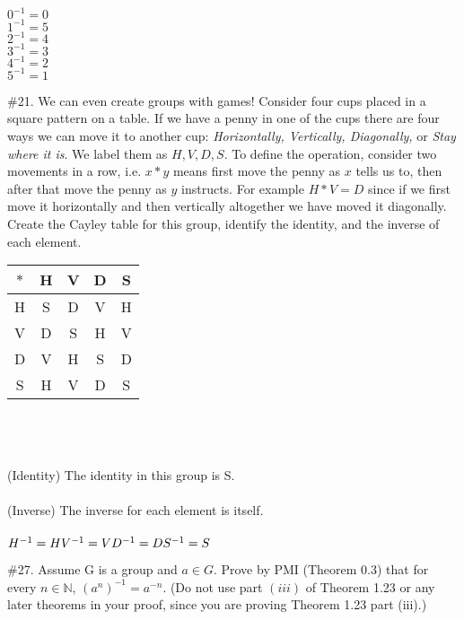 \documentclass[11pt]{amsart}
\begin{document}
\\
\\
\\$0^{-1}=0$\\$1^{-1}=5$\\$2^{-1}=4$\\$3^{-1}=3$\\$4^{-1}=2$\\$5^{-1}=1$ 

\vskip 0.5in



\#21. We can even create groups with games! Consider four cups placed in a square pattern on a table. If we have a penny in one of the cups there are four ways we can move it to another cup: \emph{Horizontally, Vertically, Diagonally,} or \emph{Stay where it is}. We label them as $H, V, D, S$. To define the operation, consider two movements in a row, i.e. $x \ast y$ means first move the penny as $x$ tells us to, then after that move the penny as $y$ instructs. For example $H \ast V = D$ since if we first move it horizontally and then vertically altogether we have moved it diagonally. Create the Cayley table for this group, identify the identity, and the inverse of each element.\\
\vskip 0.1in
\begin{tabular}{c | c  c  c  c }
	$\ast$ & H & V & D & S\\
	\hline
	H & S & D & V & H \\
	
	V & D & S & H & V \\
	
	D & V & H & S & D \\
	
	S & H & V & D & S\\
\end{tabular}
\\
\\
\\(Identity) The identity in this group is S.
\\
\\(Inverse) The inverse for each element is itself.\\ \\$H^{-1}=H\\V^{-1}=V\\D^{-1}=D\\S^{-1}=S$
\vskip 0.5in




\#27. Assume G is a group and $a \in G$. Prove by PMI (Theorem 0.3) that for every $n \in \mathbb{N}$, $(a^n)^{-1} = a^{-n}$. (Do not use part $(iii)$ of Theorem 1.23 or any later theorems in your proof, since you are proving Theorem 1.23 part (iii).)\\
\end{document}
